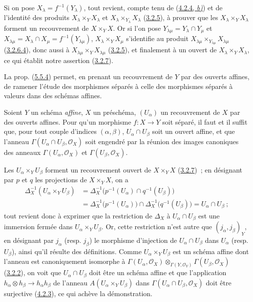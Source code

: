 Si on pose $X_\lambda=f^{-1}(Y_\lambda)$, tout revient, compte tenu de
(\hyperref[I.4.2.4-fr]{4.2.4, \emph{b)}}) et de l'identité des produits
$X_\lambda\times_Y X_\lambda$ et
$X_\lambda\times_{Y_\lambda}X_\lambda$
(\hyperref[I.3.2.5-fr]{3.2.5}), à prouver que les
$X_\lambda\times_Y X_\lambda$ forment un recouvrement de $X\times_Y X$. Or
si l'on pose $Y_{\lambda\mu}=Y_\lambda\cap Y_\mu$ et
$X_{\lambda\mu}=X_\lambda\cap X_\mu=f^{-1}(Y_{\lambda\mu})$,
$X_\lambda\times_Y X_\mu$ s'identifie au produit
$X_{\lambda\mu}\times_{Y_{\lambda\mu}}X_{\lambda\mu}$
(\hyperref[I.3.2.6.4-fr]{3.2.6.4}), donc aussi à
$X_{\lambda\mu}\times_Y X_{\lambda\mu}$
(\hyperref[I.3.2.5-fr]{3.2.5}), et finalement à un ouvert de
$X_\lambda\times_Y X_\lambda$, ce qui établit notre assertion
(\hyperref[I.3.2.7-fr]{3.2.7}).

La prop. (\hyperref[I.5.5.4-fr]{5.5.4}) permet, en prenant un recouvrement de
$Y$ par des ouverts affines, de ramener l'étude des morphismes séparés à celle
des morphismes séparés à valeurs dans des schémas affines.

\begin{proposition}[5.5.6]
\label{I.5.5.6-fr}
Soient $Y$ un schéma \emph{affine}, $X$ un préschéma, $(U_\alpha)$ un recouvrement de
$X$ par des ouverts affines. Pour qu'un morphisme $f:X\to Y$ soit séparé, il
faut et il suffit que, pour tout couple d'indices $(\alpha,\beta)$,
$U_\alpha\cap U_\beta$ soit un ouvert affine, et que l'anneau
$\Gamma(U_\alpha\cap U_\beta,\mathscr{O}_X)$ soit engendré par la réunion des
images canoniques des anneaux $\Gamma(U_\alpha,\mathscr{O}_X)$ et
$\Gamma(U_\beta,\mathscr{O}_X)$.
\end{proposition}

Les $U_\alpha\times_Y U_\beta$ forment un recouvrement ouvert de
$X\times_Y X$ (\hyperref[I.3.2.7-fr]{3.2.7})~; en désignant par $p$ et $q$ les
projections de $X\times_Y X$, on a
\[
  \begin{aligned}
    \Delta_X^{-1}(U_\alpha\times_Y U_\beta)
      &=\Delta_X^{-1}\bigl(p^{-1}(U_\alpha)\cap q^{-1}(U_\beta)\bigr)\\
      &=\Delta_X^{-1}\bigl(p^{-1}(U_\alpha)\bigr)
        \cap\Delta_X^{-1}\bigl(q^{-1}(U_\beta)\bigr)
        =U_\alpha\cap U_\beta~;
  \end{aligned}
\]
tout revient donc à exprimer que la restriction de $\Delta_X$ à
$U_\alpha\cap U_\beta$ est une immersion fermée dans
$U_\alpha\times_Y U_\beta$. Or, cette restriction n'est autre que
$(j_\alpha,j_\beta)_Y$, en désignant par $j_\alpha$ (resp. $j_\beta$) le
morphisme d'injection de $U_\alpha\cap U_\beta$ dans $U_\alpha$ (resp.
$U_\beta$), ainsi qu'il résulte des définitions. Comme
$U_\alpha\times_Y U_\beta$ est un schéma affine dont l'anneau est
canoniquement isomorphe à
$\Gamma(U_\alpha,\mathscr{O}_X)
 \otimes_{\Gamma(Y,\mathscr{O}_Y)}
 \Gamma(U_\beta,\mathscr{O}_X)$
(\hyperref[I.3.2.2-fr]{3.2.2}), on voit que $U_\alpha\cap U_\beta$ doit être
un schéma affine et que l'application
$h_\alpha\otimes h_\beta\to h_\alpha h_\beta$ de l'anneau
$A(U_\alpha\times_Y U_\beta)$ dans
$\Gamma(U_\alpha\cap U_\beta,\mathscr{O}_X)$ doit être surjective
(\hyperref[I.4.2.3-fr]{4.2.3}), ce qui achève la démonstration.


